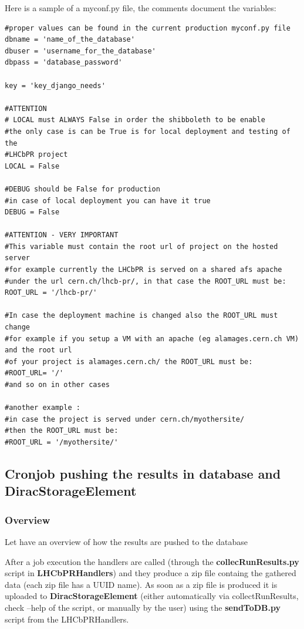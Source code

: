 \documentclass{lhcbnote}
\begin{document}
Here is a sample of a myconf.py file, the comments document the variables:

\begin{verbatim}
#proper values can be found in the current production myconf.py file 
dbname = 'name_of_the_database'
dbuser = 'username_for_the_database'
dbpass = 'database_password'

key = 'key_django_needs'

#ATTENTION
# LOCAL must ALWAYS False in order the shibboleth to be enable
#the only case is can be True is for local deployment and testing of the
#LHCbPR project
LOCAL = False

#DEBUG should be False for production 
#in case of local deployment you can have it true
DEBUG = False

#ATTENTION - VERY IMPORTANT
#This variable must contain the root url of project on the hosted server
#for example currently the LHCbPR is served on a shared afs apache
#under the url cern.ch/lhcb-pr/, in that case the ROOT_URL must be:
ROOT_URL = '/lhcb-pr/'

#In case the deployment machine is changed also the ROOT_URL must change
#for example if you setup a VM with an apache (eg alamages.cern.ch VM) and the root url 
#of your project is alamages.cern.ch/ the ROOT_URL must be:
#ROOT_URL= '/'
#and so on in other cases

#another example :
#in case the project is served under cern.ch/myothersite/
#then the ROOT_URL must be:
#ROOT_URL = '/myothersite/'

\end{verbatim}

\subsection {Cronjob pushing the results in database and DiracStorageElement}

\subsubsection {Overview}

Let have an overview of how the results are pushed to the database

After a job execution the handlers are called (through the {\bf collecRunResults.py} script in {\bf LHCbPRHandlers}) 
and they produce a zip file containg the gathered data (each zip file has a UUID name). As soon as a zip file is produced 
it is uploaded to {\bf DiracStorageElement} (either automatically via collectRunResults, check --help of the script, or manually by the user) using the {\bf sendToDB.py} script 
from the LHCbPRHandlers. 
\end{document}

